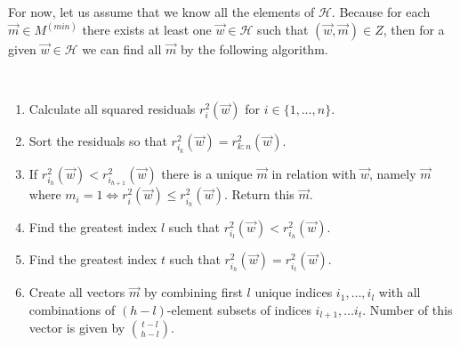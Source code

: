 For now, let us assume that we know all the elements of $\mathcal{H}$. Because for each $\vec{m} \in M^{(min)}$ there exists at least one $\vec{w} \in \mathcal{H}$ such that $(\vec{w}, \vec{m}) \in Z$, then for a given $\vec{w} \in \mathcal{H}$ we can find all $\vec{m}$ by the following algorithm.


\begin{algo} \label{find:all:m:in:relation}
    \mbox{}\vspace{\dimexpr-\baselineskip-\topsep}
\\
    \begin{enumerate}
        \item Calculate all squared residuals $r^{2}_i(\vec{w})$ for $i \in \{{1, \ldots,n\}}$.
        \item Sort the residuals so that $r^{2}_{i_k}(\vec{w}) = r^{2}_{k:n}(\vec{w})$.
        \item If $r^{2}_{i_h}(\vec{w}) < r^{2}_{i_{h+1}}(\vec{w})$ there is a unique $\vec{m}$ in relation with $\vec{w}$, namely $\vec{m}$ where $m_i = 1  \Leftrightarrow r^{2}_i(\vec{w}) \leq  r^{2}_{i_h}(\vec{w})$. Return this $\vec{m}$.
        \item Find the greatest index $l$ such that $r^{2}_{i_l}(\vec{w}) < r^{2}_{i_h}(\vec{w})$.
        \item Find the greatest index $t$ such that $ r^{2}_{i_h}(\vec{w}) = r^{2}_{i_t}(\vec{w})$.
        \item Create all vectors $\vec{m}$ by combining first $l$ unique indices $i_1, \ldots ,i_l$ with all combinations of $(h-l)$-element subsets of indices $i_{l+1}, \ldots i_t$. Number of this vector is given by $\binom{t-l}{h-l}$.
    \end{enumerate}
\end{algo}




